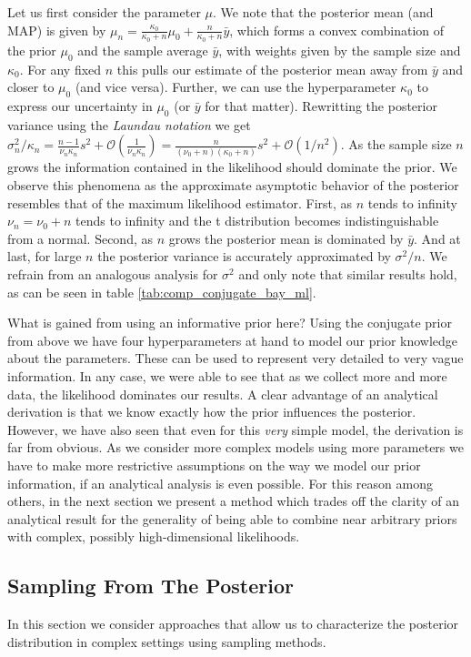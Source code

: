 Let us first consider the parameter $\mu$.
We note that the posterior mean (and MAP) is given by $\mu_n =\frac{\kappa_0}{\kappa_0 + n}\mu_0 + \frac{n}{\kappa_0 + n}\bar{y}$, which forms a convex combination of the prior $\mu_0$ and the sample average $\bar{y}$, with weights given by the sample size and $\kappa_0$.
For any fixed $n$ this pulls our estimate of the posterior mean away from $\bar{y}$ and closer to $\mu_0$ (and vice versa).
Further, we can use the hyperparameter $\kappa_0$ to express our uncertainty in $\mu_0$ (or $\bar{y}$ for that matter).
Rewritting the posterior variance using the \emph{Laundau notation} we get $\sigma_n^2 / \kappa_n = \frac{n-1}{\nu_n \kappa_n} s^2 + \mathcal{O}(\frac{1}{\nu_n\kappa_n}) = \frac{n}{(\nu_0 + n)(\kappa_0 + n)} s^2 + \mathcal{O}(1/n^2)$.
As the sample size $n$ grows the information contained in the likelihood should dominate the prior.
We observe this phenomena as the approximate asymptotic behavior of the posterior resembles that of the maximum likelihood estimator.
First, as $n$ tends to infinity $\nu_n = \nu_0 + n$ tends to infinity and the t distribution becomes indistinguishable from a normal.
Second, as $n$ grows the posterior mean is dominated by $\bar{y}$. And at last, for large $n$ the posterior variance is accurately approximated by $\sigma^2 / n$.
We refrain from an analogous analysis for $\sigma^2$ and only note that similar results hold, as can be seen in table \ref{tab:comp_conjugate_bay_ml}.

What is gained from using an informative prior here?
Using the conjugate prior from above we have four hyperparameters at hand to model our prior knowledge about the parameters.
These can be used to represent very detailed to very vague information.
In any case, we were able to see that as we collect more and more data, the likelihood dominates our results.
A clear advantage of an analytical derivation is that we know exactly how the prior influences the posterior.
However, we have also seen that even for this \emph{very} simple model, the derivation is far from obvious.
As we consider more complex models using more parameters we have to make more restrictive assumptions on the way we model our prior information, if an analytical analysis is even possible.
For this reason among others, in the next section we present a method which trades off the clarity of an analytical result for the generality of being able to combine near arbitrary priors with complex, possibly high-dimensional likelihoods.

\subsection{Sampling From The Posterior}
In this section we consider approaches that allow us to characterize the posterior distribution in complex settings using sampling methods.

